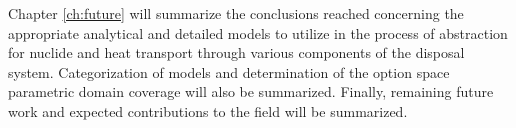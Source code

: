 % 

Chapter \ref{ch:future} will summarize the conclusions reached 
concerning the appropriate analytical and detailed models to utilize 
in the process of abstraction for nuclide and heat transport through 
various components of the disposal system. Categorization of models 
and determination of the option space parametric domain coverage will 
also be summarized. Finally, remaining future work and expected 
contributions to the field will be summarized. 
